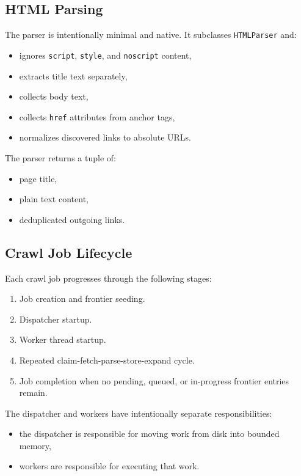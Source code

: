 \documentclass[pdftex,12pt,a4paper]{article}
\begin{document}
\subsection{HTML Parsing}

The parser is intentionally minimal and native. It subclasses \texttt{HTMLParser} and:

\begin{itemize}
    \item ignores \texttt{script}, \texttt{style}, and \texttt{noscript} content,
    \item extracts title text separately,
    \item collects body text,
    \item collects \texttt{href} attributes from anchor tags,
    \item normalizes discovered links to absolute URLs.
\end{itemize}

The parser returns a tuple of:

\begin{itemize}
    \item page title,
    \item plain text content,
    \item deduplicated outgoing links.
\end{itemize}

\subsection{Crawl Job Lifecycle}

Each crawl job progresses through the following stages:

\begin{enumerate}
    \item Job creation and frontier seeding.
    \item Dispatcher startup.
    \item Worker thread startup.
    \item Repeated claim-fetch-parse-store-expand cycle.
    \item Job completion when no pending, queued, or in-progress frontier entries remain.
\end{enumerate}

The dispatcher and workers have intentionally separate responsibilities:

\begin{itemize}
    \item the dispatcher is responsible for moving work from disk into bounded memory,
    \item workers are responsible for executing that work.
\end{itemize}
\end{document}
